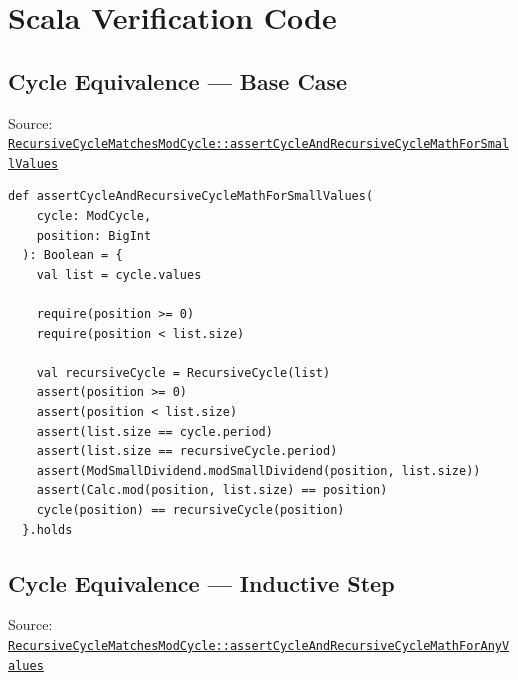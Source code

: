 \section{Scala Verification Code}

\subsection{Cycle Equivalence --- Base Case}

{\raggedright
Source:
\href{https://github.com/thiagomata/prime-numbers/blob/cycle-article-v1.0.0/src/main/scala/v1/chapter4/cycle/recursive/properties/RecursiveCycleMatchesModCycle.scala}{\texttt{RecursiveCycleMatchesModCycle::\allowbreak assertCycleAndRecursiveCycleMathForSmallValues}}
\par}

\begin{lstlisting}[style=scala]
  def assertCycleAndRecursiveCycleMathForSmallValues(
    cycle: ModCycle,
    position: BigInt
  ): Boolean = {
    val list = cycle.values

    require(position >= 0)
    require(position < list.size)

    val recursiveCycle = RecursiveCycle(list)
    assert(position >= 0)
    assert(position < list.size)
    assert(list.size == cycle.period)
    assert(list.size == recursiveCycle.period)
    assert(ModSmallDividend.modSmallDividend(position, list.size))
    assert(Calc.mod(position, list.size) == position)
    cycle(position) == recursiveCycle(position)
  }.holds
\end{lstlisting}

\subsection{Cycle Equivalence --- Inductive Step}

{\raggedright
Source:
\href{https://github.com/thiagomata/prime-numbers/blob/cycle-article-v1.0.0/src/main/scala/v1/chapter4/cycle/recursive/properties/RecursiveCycleMatchesModCycle.scala}{\texttt{RecursiveCycleMatchesModCycle::\allowbreak assertCycleAndRecursiveCycleMathForAnyValues}}
\par}

